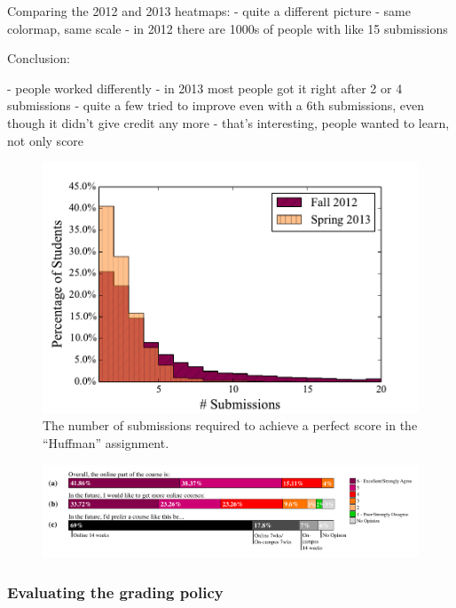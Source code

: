 \documentclass{sig-alternate}
\begin{document}
Comparing the 2012 and 2013 heatmaps:
- quite a different picture
- same colormap, same scale
- in 2012 there are 1000s of people with like 15 submissions

Conclusion:

- people worked differently
- in 2013 most people got it right after 2 or 4 submissions
- quite a few tried to improve even with a 6th submissions, even though it didn't
  give credit any more
- that's interesting, people wanted to learn, not only score

\begin{figure}[ht!]
  \centering
  \includegraphics[width=\columnwidth]{plots/top-scores-submissions-histogram.pdf}
  \caption{The number of submissions required to achieve a perfect score in the ``Huffman'' assignment.}
  \label{fig:top-scores-submissions}
\end{figure}

\begin{figure}[ht!]
  \centering
  \includegraphics[width=\textwidth]{plots/epfl-course-eval.pdf}
  \caption{}
  \label{fig:epfl-course-eval}
\end{figure}


\subsubsection{Evaluating the grading policy}\label{sec:eval-grading-policy}
\end{document}
